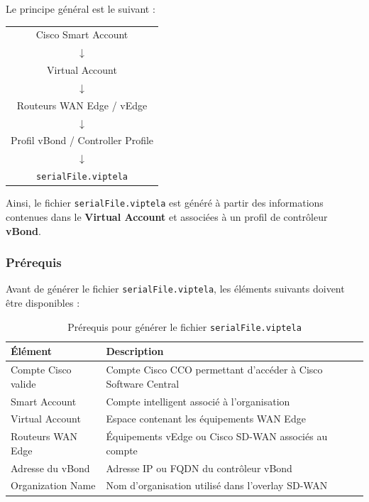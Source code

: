 \documentclass[12pt,a4paper,oneside]{report}
\begin{document}
	Le principe général est le suivant :
	
	\begin{center}
		\begin{tabular}{c}
			Cisco Smart Account \\
			$\downarrow$ \\
			Virtual Account \\
			$\downarrow$ \\
			Routeurs WAN Edge / vEdge \\
			$\downarrow$ \\
			Profil vBond / Controller Profile \\
			$\downarrow$ \\
			\texttt{serialFile.viptela} \\
		\end{tabular}
	\end{center}
	
	Ainsi, le fichier \texttt{serialFile.viptela} est généré à partir des informations contenues dans le \textbf{Virtual Account} et associées à un profil de contrôleur \textbf{vBond}.
	
	\subsubsection{Prérequis}
	
	Avant de générer le fichier \texttt{serialFile.viptela}, les éléments suivants doivent être disponibles :
	
	\begin{table}[H]
		\centering
		\renewcommand{\arraystretch}{1.2}
		\begin{tabular}{|p{}|p{}|}
			\hline
			\textbf{Élément} & \textbf{Description} \\
			\hline
			Compte Cisco valide & Compte Cisco CCO permettant d'accéder à Cisco Software Central \\
			\hline
			Smart Account & Compte intelligent associé à l'organisation \\
			\hline
			Virtual Account & Espace contenant les équipements WAN Edge \\
			\hline
			Routeurs WAN Edge & Équipements vEdge ou Cisco SD-WAN associés au compte \\
			\hline
			Adresse du vBond & Adresse IP ou FQDN du contrôleur vBond \\
			\hline
			Organization Name & Nom d'organisation utilisé dans l'overlay SD-WAN \\
			\hline
		\end{tabular}
		\caption{Prérequis pour générer le fichier \texttt{serialFile.viptela}}
		\label{tab:prerequis-serialfile-viptela}
	\end{table}
	
\end{document}
